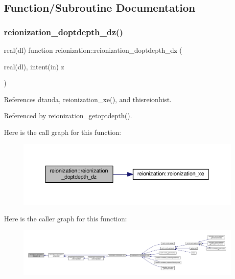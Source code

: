 \subsection{Function/\+Subroutine Documentation}
\mbox{\label{namespacereionization_a9b89486311458d0dbd526fc233ca5ba5}} 
\subsubsection{\texorpdfstring{reionization\+\_\+doptdepth\+\_\+dz()}{reionization\_doptdepth\_dz()}}
{\footnotesize\ttfamily real(dl) function reionization\+::reionization\+\_\+doptdepth\+\_\+dz (\begin{DoxyParamCaption}\item[{real(dl), intent(in)}]{z }\end{DoxyParamCaption})}



References dtauda, reionization\+\_\+xe(), and thisreionhist.



Referenced by reionization\+\_\+getoptdepth().

Here is the call graph for this function\+:
\nopagebreak
\begin{figure}[H]
\begin{center}
\leavevmode
\includegraphics[width=350pt]{namespacereionization_a9b89486311458d0dbd526fc233ca5ba5_cgraph}
\end{center}
\end{figure}
Here is the caller graph for this function\+:
\nopagebreak
\begin{figure}[H]
\begin{center}
\leavevmode
\includegraphics[width=350pt]{namespacereionization_a9b89486311458d0dbd526fc233ca5ba5_icgraph}
\end{center}
\end{figure}
\mbox{\label{namespacereionization_a8a3b0a917762ce13033f59ef52fad521}} 
